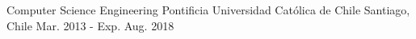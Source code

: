 

\begin{cventries}

  \cventry
    {Computer Science Engineering} %
    {Pontificia Universidad Católica de Chile} %
    {Santiago, Chile} %
    {Mar. 2013 - Exp. Aug. 2018} %
    {}

\end{cventries}
